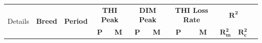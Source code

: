 \begin{table}[htbp]
    \centering
    \begin{tabular}{c c c c c c c c c c c c}
        \toprule
        \multirow{2}{*}{Details} &
        \multirow{2}{*}{\textbf{Breed}} &
        \multirow{2}{*}{\textbf{Period}} &
        \multicolumn{2}{c}{\textbf{THI Peak}} &
        \multicolumn{2}{c}{\textbf{DIM Peak}} &
        \multicolumn{2}{c}{\textbf{THI Loss Rate}} &
        \multicolumn{2}{c}{$\mathbf{R^2}$} \\
        \cmidrule(lr){4-5} \cmidrule(lr){6-7} \cmidrule(lr){8-9} \cmidrule(lr){10-11}
        & & &
        \textbf{P} & \textbf{M} &
        \textbf{P} & \textbf{M} &
        \textbf{P} & \textbf{M} &
        $\mathbf{R^2_m}$ & $\mathbf{R^2_c}$ & \\
        \hline
        \hline
        

\end{tabular}
\end{table}
